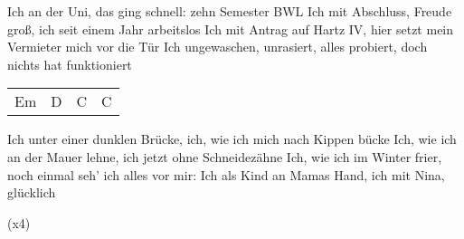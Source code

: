 \begin{guitar}
	Ich an der Uni, das ging schnell: zehn Semester BWL
	Ich mit Abschluss, Freude groß, ich seit einem Jahr arbeitslos
	Ich mit Antrag auf Hartz IV, hier setzt mein Vermieter mich vor die Tür
	Ich ungewaschen, unrasiert, alles probiert, doch nichts hat funktioniert
	
	{\footnotesize\begin{tabular}{l|l|l|l}
			Em & D & C & C
	\end{tabular}}

	Ich unter einer dunklen Brücke, ich, wie ich mich nach Kippen bücke
	Ich, wie ich an der Mauer lehne, ich jetzt ohne Schneidezähne
	Ich, wie ich im Winter frier, noch einmal seh' ich alles vor mir:
	Ich als Kind an Mamas Hand, ich mit Nina, glücklich
	
	  (x4)
	
\end{guitar}